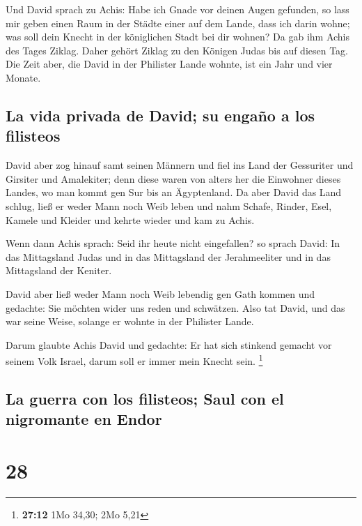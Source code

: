  Und David sprach zu Achis: Habe ich Gnade vor deinen
Augen gefunden, so lass mir geben einen Raum in der Städte einer auf dem
Lande, dass ich darin wohne; was soll dein Knecht in der königlichen
Stadt bei dir wohnen?  Da gab ihm Achis des Tages Ziklag.
Daher gehört Ziklag zu den Königen Judas bis auf diesen Tag.
 Die Zeit aber, die David in der Philister Lande wohnte,
ist ein Jahr und vier Monate.

\hypertarget{la-vida-privada-de-david-su-engauxf1o-a-los-filisteos}{%
\subsection{La vida privada de David; su engaño a los
filisteos}\label{la-vida-privada-de-david-su-engauxf1o-a-los-filisteos}}

 David aber zog hinauf samt seinen Männern und fiel ins
Land der Gessuriter und Girsiter und Amalekiter; denn diese waren von
alters her die Einwohner dieses Landes, wo man kommt gen Sur bis an
Ägyptenland.  Da aber David das Land schlug, ließ er weder
Mann noch Weib leben und nahm Schafe, Rinder, Esel, Kamele und Kleider
und kehrte wieder und kam zu Achis.

 Wenn dann Achis sprach: Seid ihr heute nicht
eingefallen? so sprach David: In das Mittagsland Judas und in das
Mittagsland der Jerahmeeliter und in das Mittagsland der Keniter.

 David aber ließ weder Mann noch Weib lebendig gen Gath
kommen und gedachte: Sie möchten wider uns reden und schwätzen. Also tat
David, und das war seine Weise, solange er wohnte in der Philister
Lande.

 Darum glaubte Achis David und gedachte: Er hat sich
stinkend gemacht vor seinem Volk Israel, darum soll er immer mein Knecht
sein. \footnote{\textbf{27:12} 1Mo 34,30; 2Mo 5,21}

\hypertarget{la-guerra-con-los-filisteos-saul-con-el-nigromante-en-endor}{%
\subsection{La guerra con los filisteos; Saul con el nigromante en
Endor}\label{la-guerra-con-los-filisteos-saul-con-el-nigromante-en-endor}}

\hypertarget{section-27}{%
\section{28}\label{section-27}}

